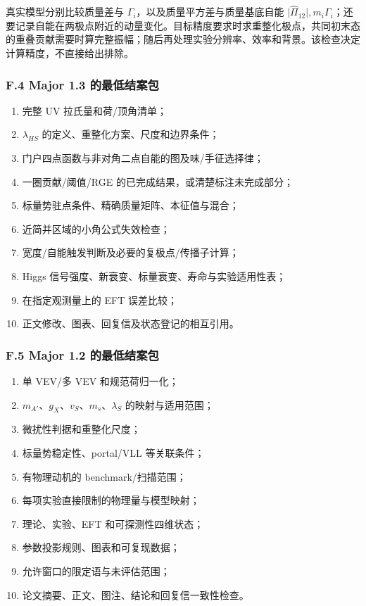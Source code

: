 \documentclass[
]{article}
\providecommand{\tightlist}{%
  \setlength{\itemsep}{0pt}\setlength{\parskip}{0pt}}
\begin{document}
真实模型分别比较质量差与 \(\Gamma_i\)，以及质量平方差与质量基底自能
\(\lvert\widehat\Pi_{12}\rvert,m_i\Gamma_i\)；还要记录自能在两极点附近的动量变化。目标精度要求时求重整化极点，共同初末态的重叠贡献需要时算完整振幅；随后再处理实验分辨率、效率和背景。该检查决定计算精度，不直接给出排除。

\subsubsection{F.4 Major 1.3
的最低结案包}\label{f.4-major-1.3-ux7684ux6700ux4f4eux7ed3ux6848ux5305}

\begin{enumerate}
\def\labelenumi{\arabic{enumi}.}
\tightlist
\item
  完整 UV 拉氏量和荷/顶角清单；
\item
  \(\lambda_{HS}\) 的定义、重整化方案、尺度和边界条件；
\item
  门户四点函数与非对角二点自能的图及味/手征选择律；
\item
  一圈贡献/阈值/RGE 的已完成结果，或清楚标注未完成部分；
\item
  标量势驻点条件、精确质量矩阵、本征值与混合；
\item
  近简并区域的小角公式失效检查；
\item
  宽度/自能触发判断及必要的复极点/传播子计算；
\item
  Higgs 信号强度、新衰变、标量衰变、寿命与实验适用性表；
\item
  在指定观测量上的 EFT 误差比较；
\item
  正文修改、图表、回复信及状态登记的相互引用。
\end{enumerate}

\subsubsection{F.5 Major 1.2
的最低结案包}\label{f.5-major-1.2-ux7684ux6700ux4f4eux7ed3ux6848ux5305}

\begin{enumerate}
\def\labelenumi{\arabic{enumi}.}
\tightlist
\item
  单 VEV/多 VEV 和规范荷归一化；
\item
  \(m_{A'}\)、\(g_X\)、\(v_S\)、\(m_s\)、\(\lambda_S\)
  的映射与适用范围；
\item
  微扰性判据和重整化尺度；
\item
  标量势稳定性、portal/VLL 等关联条件；
\item
  有物理动机的 benchmark/扫描范围；
\item
  每项实验直接限制的物理量与模型映射；
\item
  理论、实验、EFT 和可探测性四维状态；
\item
  参数投影规则、图表和可复现数据；
\item
  允许窗口的限定语与未评估范围；
\item
  论文摘要、正文、图注、结论和回复信一致性检查。
\end{enumerate}
\end{document}
